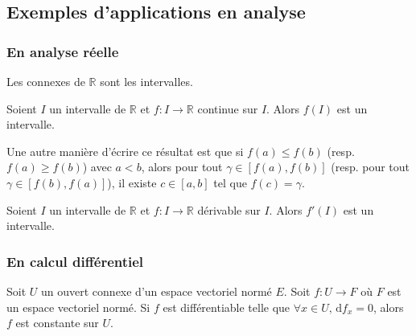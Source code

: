 	\newpage

	\subsection{Exemples d'applications en analyse}

	\subsubsection{En analyse réelle}


	\begin{theorem}
		Les connexes de $\mathbb{R}$ sont les intervalles.
	\end{theorem}

	\begin{theorem}
		Soient $I$ un intervalle de $\mathbb{R}$ et $f : I \rightarrow \mathbb{R}$ continue sur $I$. Alors $f(I)$ est un intervalle.
	\end{theorem}

	\begin{remark}
		Une autre manière d'écrire ce résultat est que si $f(a) \leq f(b)$ (resp. $f(a) \geq f(b)$) avec $a<b$, alors pour tout $\gamma \in [f(a),f(b)]$ (resp. pour tout $\gamma \in [f(b),f(a)]$), il existe $c \in [a,b]$ tel que $f(c) = \gamma$.
	\end{remark}


	\begin{corollary}[Darboux]
		Soient $I$ un intervalle de $\mathbb{R}$ et $f : I \rightarrow \mathbb{R}$ dérivable sur $I$. Alors $f'(I)$ est un intervalle.
	\end{corollary}

	\subsubsection{En calcul différentiel}


	\begin{proposition}
		Soit $U$ un ouvert connexe d'un espace vectoriel normé $E$. Soit $f : U \rightarrow F$ où $F$ est un espace vectoriel normé. Si $f$ est différentiable telle que $\forall x \in U, \, \mathrm{d}f_x = 0$, alors $f$ est constante sur $U$.
	\end{proposition}


